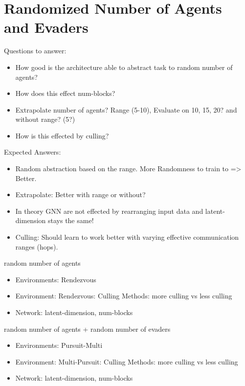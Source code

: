 \section{Randomized Number of Agents and Evaders}
Questions to answer:
\begin{itemize}[noitemsep,nolistsep]
    \item How good is the architecture able to abstract task to random number of agents?
    \item How does this effect num-blocks?
    \item Extrapolate number of agents? Range (5-10), Evaluate on 10, 15, 20? and without range? (5?)
    \item How is this effected by culling?
\end{itemize}
Expected Answers:
\begin{itemize}[noitemsep,nolistsep]
    \item Random abstraction based on the range. More Randomness to train to => Better.
    \item Extrapolate: Better with range or without? 
    \item In theory GNN are not effected by rearranging input data and latent-dimension stays the same!
    \item Culling: Should learn to work better with varying effective communication ranges (hops).
\end{itemize}
random number of agents
\begin{itemize}[noitemsep,nolistsep]
    \item Environments: Rendezvous
    \item Environment: Rendezvous: Culling Methods: more culling vs less culling
    \item Network: latent-dimension, num-blocks
\end{itemize}
random number of agents + random number of evaders
\begin{itemize}[noitemsep,nolistsep]
    \item Environments: Pursuit-Multi
    \item Environment: Multi-Pursuit: Culling Methods: more culling vs less culling
    \item Network: latent-dimension, num-blocks
\end{itemize}


